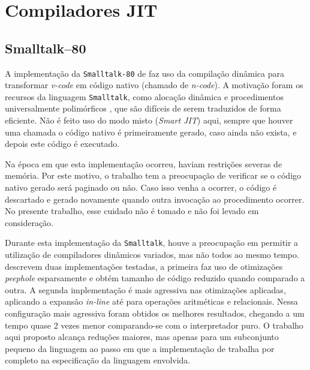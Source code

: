 \section{Compiladores JIT}

\subsection{Smalltalk--80}

A implementação da \texttt{Smalltalk-80} \cite{bluebook} de
 faz uso da compilação dinâmica para
transformar \textit{v-code} em código nativo (chamado de
\textit{n-code}). A motivação foram os
recursos da linguagem \texttt{Smalltalk}, como alocação dinâmica e
procedimentos universalmente polimórficos \cite{sebesta}, que são
difíceis de serem traduzidos de forma eficiente. Não é feito uso do
modo misto (\textit{Smart JIT}) aqui, sempre que houver uma chamada
o código nativo é primeiramente gerado, caso ainda não exista, e
depois este código é executado.

Na época em que esta implementação ocorreu, haviam restrições severas
de memória. Por este motivo, o trabalho tem a preocupação de verificar
se o código nativo gerado será paginado ou não. Caso isso venha a
ocorrer, o código é descartado e gerado novamente quando outra
invocação ao procedimento ocorrer. No presente trabalho, esse cuidado
não é tomado e não foi levado em consideração.

Durante esta implementação da \texttt{Smalltalk}, houve a preocupação
em permitir a utilização
de compiladores dinâmicos
variados, mas não todos ao mesmo tempo.
 descrevem duas implementações
testadas, a primeira faz uso de otimizações \textit{peephole}
\cite{muchnick} esparsamente e obtém tamanho de código reduzido
quando comparado a outra. A segunda implementação é mais agressiva nas
otimizações aplicadas, aplicando a expansão \textit{in-line} até para
operações aritméticas e relacionais. Nessa configuração mais agressiva
foram obtidos os melhores resultados, chegando a um tempo quase 2
vezes menor comparando-se com o interpretador puro. O trabalho aqui proposto
alcança reduções maiores, mas apenas para um subconjunto
pequeno da linguagem ao passo em que a implementação de
 trabalha por completo na
especificação da linguagem envolvida.

%

